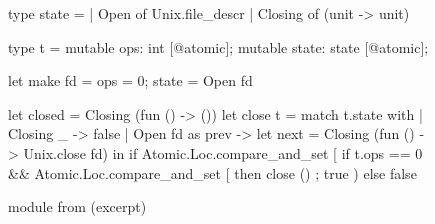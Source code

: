 \begin{figure}[tp]
\begin{ocamlcode}
type state =
  | Open of Unix.file_descr
  | Closing of (unit -> unit)

type t =
  { mutable ops: int [@atomic];
    mutable state: state [@atomic]; }

let make fd = { ops = 0; state = Open fd }

let closed = Closing (fun () -> ())
let close t =
  match t.state with
  | Closing _ -> false
  | Open fd as prev ->
      let next = Closing (fun () -> Unix.close fd) in
      if Atomic.Loc.compare_and_set [%
        if t.ops == 0
        && Atomic.Loc.compare_and_set [%
        then close () ;
        true
      ) else false
\end{ocamlcode}
\caption{ module from \Eio (excerpt)}
\label{fig:rcfd}
\end{figure}
